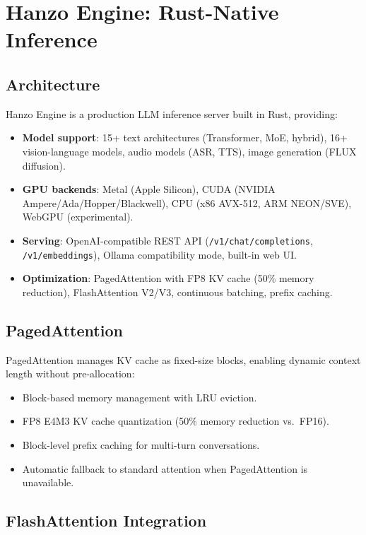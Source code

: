 \documentclass[11pt,letterpaper]{article}
\begin{document}
\section{Hanzo Engine: Rust-Native Inference}

\subsection{Architecture}

Hanzo Engine is a production LLM inference server built in Rust, providing:

\begin{itemize}
\item \textbf{Model support}: 15+ text architectures (Transformer, MoE, hybrid), 16+ vision-language models, audio models (ASR, TTS), image generation (FLUX diffusion).
\item \textbf{GPU backends}: Metal (Apple Silicon), CUDA (NVIDIA Ampere/Ada/Hopper/Blackwell), CPU (x86 AVX-512, ARM NEON/SVE), WebGPU (experimental).
\item \textbf{Serving}: OpenAI-compatible REST API (\texttt{/v1/chat/completions}, \texttt{/v1/embeddings}), Ollama compatibility mode, built-in web UI.
\item \textbf{Optimization}: PagedAttention with FP8 KV cache (50\% memory reduction), FlashAttention V2/V3, continuous batching, prefix caching.
\end{itemize}

\subsection{PagedAttention}

PagedAttention manages KV cache as fixed-size blocks, enabling dynamic context length without pre-allocation:

\begin{itemize}
\item Block-based memory management with LRU eviction.
\item FP8 E4M3 KV cache quantization (50\% memory reduction vs.\ FP16).
\item Block-level prefix caching for multi-turn conversations.
\item Automatic fallback to standard attention when PagedAttention is unavailable.
\end{itemize}

\subsection{FlashAttention Integration}
\end{document}
